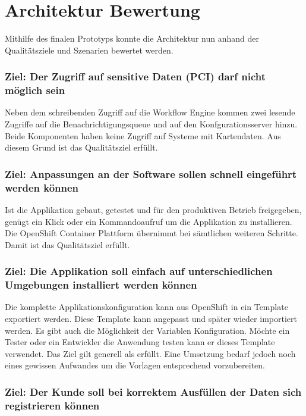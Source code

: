\section{Architektur Bewertung}

Mithilfe des finalen Prototyps konnte die Architektur nun anhand der Qualitätsziele und Szenarien bewertet werden.

\subsubsection{Ziel: Der Zugriff auf sensitive Daten (PCI) darf nicht möglich sein}

Neben dem schreibenden Zugriff auf die Workflow Engine kommen zwei lesende Zugriffe auf die Benachrichtigungsqueue und auf den Konfgurationsserver hinzu. Beide Komponenten haben keine Zugriff auf Systeme mit Kartendaten. Aus diesem Grund ist das Qualitätsziel erfüllt.

\subsubsection{Ziel: Anpassungen an der Software sollen schnell eingeführt werden können}

Ist die Applikation gebaut, getestet und für den produktiven Betrieb freigegeben, genügt ein Klick oder ein Kommandoaufruf um die Applikation zu installieren. Die OpenShift Container Plattform übernimmt bei sämtlichen weiteren Schritte. Damit ist das Qualitätsziel erfüllt.

\subsubsection{Ziel: Die Applikation soll einfach auf unterschiedlichen Umgebungen installiert werden können}

Die komplette Applikationskonfiguration kann aus OpenShift in ein Template exportiert werden. Diese Template kann angepasst und später wieder importiert werden. Es gibt auch die Möglichkeit der Variablen Konfiguration. Möchte ein Tester oder ein Entwickler die Anwendung testen kann er dieses Template verwendet. Das Ziel gilt generell als erfüllt. Eine Umsetzung bedarf jedoch noch eines gewissen Aufwandes um die Vorlagen entsprechend vorzubereiten.

\subsubsection{Ziel: Der Kunde soll bei korrektem Ausfüllen der Daten sich registrieren können}

